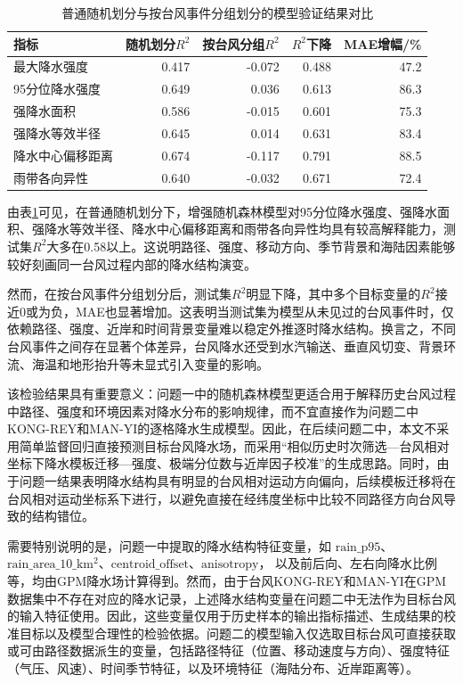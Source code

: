 \documentclass[UTF8,a4paper,zihao=5]{ctexart}
\numberwithin{equation}{section}
\numberwithin{figure}{section}
\numberwithin{table}{section}
\begin{document}
\begin{table}[htbp]
    \centering
    \caption{普通随机划分与按台风事件分组划分的模型验证结果对比}
    \label{tab:random_vs_group_validation_problem1}
    \small
    \begin{tabular}{lrrrr}
        \hline
        指标 & 随机划分$R^2$ & 按台风分组$R^2$ & $R^2$下降 & MAE增幅/\% \\
        \hline
        最大降水强度 & 0.417 & -0.072 & 0.488 & 47.2 \\
        95分位降水强度 & 0.649 & 0.036 & 0.613 & 86.3 \\
        强降水面积 & 0.586 & -0.015 & 0.601 & 75.3 \\
        强降水等效半径 & 0.645 & 0.014 & 0.631 & 83.4 \\
        降水中心偏移距离 & 0.674 & -0.117 & 0.791 & 88.5 \\
        雨带各向异性 & 0.640 & -0.032 & 0.671 & 72.4 \\
        \hline
    \end{tabular}
\end{table}

由表\ref{tab:random_vs_group_validation_problem1}可见，在普通随机划分下，增强随机森林模型对95分位降水强度、强降水面积、强降水等效半径、降水中心偏移距离和雨带各向异性均具有较高解释能力，测试集$R^2$大多在0.58以上。这说明路径、强度、移动方向、季节背景和海陆因素能够较好刻画同一台风过程内部的降水结构演变。

然而，在按台风事件分组划分后，测试集$R^2$明显下降，其中多个目标变量的$R^2$接近0或为负，MAE也显著增加。这表明当测试集为模型从未见过的台风事件时，仅依赖路径、强度、近岸和时间背景变量难以稳定外推逐时降水结构。换言之，不同台风事件之间存在显著个体差异，台风降水还受到水汽输送、垂直风切变、背景环流、海温和地形抬升等未显式引入变量的影响。

该检验结果具有重要意义：问题一中的随机森林模型更适合用于解释历史台风过程中路径、强度和环境因素对降水分布的影响规律，而不宜直接作为问题二中KONG-REY和MAN-YI的逐格降水生成模型。因此，在后续问题二中，本文不采用简单监督回归直接预测目标台风降水场，而采用“相似历史时次筛选—台风相对坐标下降水模板迁移—强度、极端分位数与近岸因子校准”的生成思路。同时，由于问题一结果表明降水结构具有明显的台风相对运动方向偏向，后续模板迁移将在台风相对运动坐标系下进行，以避免直接在经纬度坐标中比较不同路径方向台风导致的结构错位。

需要特别说明的是，问题一中提取的降水结构特征变量，如
$\mathrm{rain\_p95}$、$\mathrm{rain\_area\_10\_km^2}$、$\mathrm{centroid\_offset}$、$\mathrm{anisotropy}$，
以及前后向、左右向降水比例等，均由GPM降水场计算得到。然而，由于台风KONG-REY和MAN-YI在GPM数据集中不存在对应的降水记录，上述降水结构变量在问题二中无法作为目标台风的输入特征使用。因此，这些变量仅用于历史样本的输出指标描述、生成结果的校准目标以及模型合理性的检验依据。问题二的模型输入仅选取目标台风可直接获取或可由路径数据派生的变量，包括路径特征（位置、移动速度与方向）、强度特征（气压、风速）、时间季节特征，以及环境特征（海陆分布、近岸距离等）。
\end{document}
